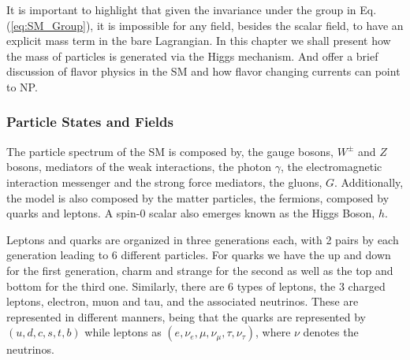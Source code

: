 \documentclass[10pt]{book}
\renewcommand{\(}{\left(}
\renewcommand{\)}{\right)}
\renewcommand{\[}{\left[}
\renewcommand{\]}{\right]}
\begin{document}
It is important to highlight that given the invariance under the group in Eq.\,(\ref{eq:SM_Group}), it is impossible for any field, besides the scalar field, to have an explicit mass term in the bare Lagrangian.
%
In this chapter we shall present how the mass of particles is generated via the Higgs mechanism.
%
And offer a brief discussion of flavor physics in the SM and how flavor changing currents can point to NP. 


\subsubsection{Particle States and Fields}

The particle spectrum of the SM is composed by, the gauge bosons, $W^\pm$ and $Z$ bosons, mediators of the weak interactions, the photon $\gamma$, the electromagnetic interaction messenger and the strong force mediators, the gluons, $G$. 
%
Additionally, the model is also composed  by the matter particles, the fermions, composed by quarks and leptons. A spin-0 scalar also emerges known as the Higgs Boson, $h$. 

Leptons and quarks are organized in three generations each, with 2 pairs by each generation leading to 6 different particles. 
%
For quarks we have the up and down for the first generation, charm and strange for the second as well as the top and bottom for the third one. 
%
Similarly, there are 6 types of leptons, the 3 charged leptons, electron, muon and tau, and the associated neutrinos. 
%
These are represented in different manners, being that the quarks are represented by $(u,d,c,s,t,b)$ while leptons as $(e,\nu_{e},\mu,\nu_{\mu},\tau,\nu_{\tau})$, where $\nu$ denotes the neutrinos. 
\end{document}
